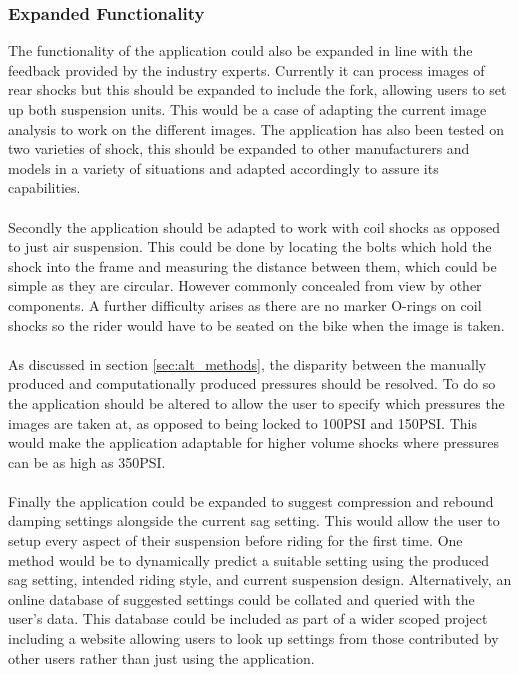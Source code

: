 		\subsubsection{Expanded Functionality}
			The functionality of the application could also be expanded in line with the feedback provided by the industry experts. Currently it can process images of rear shocks but this should be expanded to include the fork, allowing users to set up both suspension units. This would be a case of adapting the current image analysis to work on the different images. The application has also been tested on two varieties of shock, this should be expanded to other manufacturers and models in a variety of situations and adapted accordingly to assure its capabilities.
			\\\\
			Secondly the application should be adapted to work with coil shocks as opposed to just air suspension. This could be done by locating the bolts which hold the shock into the frame and measuring the distance between them, which could be simple as they are circular. However commonly concealed from view by other components. A further difficulty arises as there are no marker O-rings on coil shocks so the rider would have to be seated on the bike when the image is taken.
			\\\\
			As discussed in section \ref{sec:alt_methods}, the disparity between the manually produced and computationally produced pressures should be resolved. To do so the application should be altered to allow the user to specify which pressures the images are taken at, as opposed to being locked to 100PSI and 150PSI. This would make the application adaptable for higher volume shocks where pressures can be as high as 350PSI.
			\\\\
			Finally the application could be expanded to suggest compression and rebound damping settings alongside the current sag setting. This would allow the user to setup every aspect of their suspension before riding for the first time. One method would be to dynamically predict a suitable setting using the produced sag setting, intended riding style, and current suspension design. Alternatively, an online database of suggested settings could be collated and queried with the user's data. This database could be included as part of a wider scoped project including a website allowing users to look up settings from those contributed by other users rather than just using the application.
